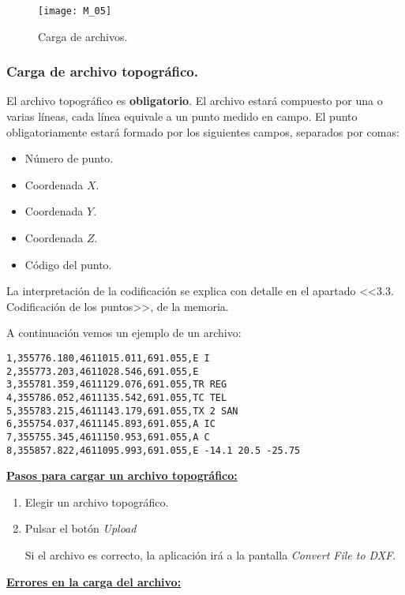 \begin{figure}[H]
	\centering
	\texttt{[image: M\_05]}
	\caption{Carga de archivos.}
	\label{fig:M_05}
\end{figure}

\subsubsection{Carga de archivo topográfico.}

El archivo topográfico es \textbf{obligatorio}. El archivo estará compuesto por una o varias líneas, cada línea equivale a un punto medido en campo. El punto obligatoriamente estará formado por los siguientes campos, separados por comas:
\begin{itemize}
\item Número de punto.
\item Coordenada $X$.
\item Coordenada $Y$.
\item Coordenada $Z$.
\item Código del punto.
\end{itemize}
La interpretación de la codificación se explica con detalle en el apartado <<3.3. Codificación de los puntos>>, de la memoria.



A continuación vemos un ejemplo de un archivo:

\begin{verbatim}
1,355776.180,4611015.011,691.055,E I
2,355773.203,4611028.546,691.055,E
3,355781.359,4611129.076,691.055,TR REG
4,355786.052,4611135.542,691.055,TC TEL
5,355783.215,4611143.179,691.055,TX 2 SAN
6,355754.037,4611145.893,691.055,A IC
7,355755.345,4611150.953,691.055,A C
8,355857.822,4611095.993,691.055,E -14.1 20.5 -25.75
\end{verbatim}

\textbf{\underline{Pasos para cargar un archivo topográfico:} }

\begin{enumerate}

\item Elegir un archivo topográfico.
\item Pulsar el botón \emph{Upload}

Si el archivo es correcto, la aplicación irá a la pantalla \emph{Convert File to DXF}.

\end{enumerate}

\textbf{\underline{Errores en la carga del archivo:} }

